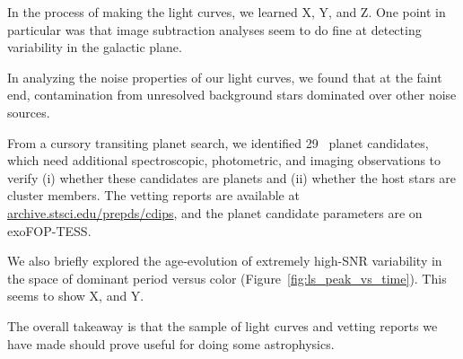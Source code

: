 \documentclass[12pt,twocolumn,tighten]{aastex62}
\newcommand{\numberpcs}{29\ }  %
\newcommand{\stscilink} {\url{archive.stsci.edu/prepds/cdips}}
\begin{document}
In the process of making the light curves, we learned X, Y, and Z.
One point in particular was that image subtraction analyses seem to
do fine at detecting variability in the galactic plane.

In analyzing the noise properties of our light curves, we found that
at the faint end, contamination from unresolved background stars
dominated over other noise sources.

From a cursory transiting planet search, we identified \numberpcs
planet candidates, which need additional spectroscopic, photometric,
and imaging observations to verify (i) whether these candidates are
planets and (ii) whether the host stars are cluster members.
The vetting reports are available at \stscilink, and the planet
candidate parameters are on exoFOP-TESS.

We also briefly explored the age-evolution of extremely high-SNR
variability in the space of dominant period versus color
(Figure~\ref{fig:ls_peak_vs_time}).
This seems to show X, and Y.

The overall takeaway is that the sample of light curves and vetting
reports we have made should prove useful for doing some astrophysics.
\end{document}
